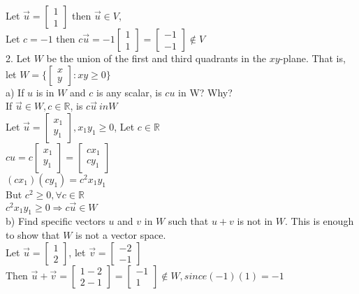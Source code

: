 \documentclass[a4paper]{article}
\begin{document}
Let $\vec{u} = \begin{bmatrix}
1\\
1
\end{bmatrix}$ then $\vec{u} \in V$,\\
Let $c = -1$ then $c\vec{u} = -1\begin{bmatrix}
1\\
1
\end{bmatrix} = \begin{bmatrix}
-1\\
-1
\end{bmatrix} \notin V$\\
2. Let $W$ be the union of the first and third quadrants in the $xy$-plane. That is, let $W = \{\begin{bmatrix}
x\\
y
\end{bmatrix} : xy \geq 0 \}$\\
a) If $u$ is in $W$ and $c$ is any scalar, is $cu$ in W? Why?\\
If $\vec{u} \in W, c \in \mathbb{R}$, is $c\vec{u} \ in W$\\
Let $\vec{u} = \begin{bmatrix}
x_1\\
y_1
\end{bmatrix}, x_1y_1 \geq 0$, Let $c \in \mathbb{R}$\\
$cu = c\begin{bmatrix}
x_1\\
y_1
\end{bmatrix} = \begin{bmatrix}
cx_1\\
cy_1
\end{bmatrix}$\\
$(cx_1)(cy_1) = c^2x_1y_1$\\
But $c^2 \geq 0, \forall c \in \mathbb{R}$\\
$c^2x_1y_1 \geq 0 \Rightarrow c\vec{u}\in W$\\
b) Find specific vectors $u$ and $v$ in $W$ such that $u + v$ is not in $W$. This is enough to show that $W$ is not a vector space.\\
Let $\vec{u} = \begin{bmatrix}
1\\
2
\end{bmatrix}$, let $\vec{v} = \begin{bmatrix}
-2\\
-1
\end{bmatrix}$\\
Then $\vec{u} + \vec{v} = \begin{bmatrix}
1-2\\
2-1
\end{bmatrix} = \begin{bmatrix}
-1\\
1
\end{bmatrix} \notin W, since (-1)(1) = -1$\\
\end{document}
